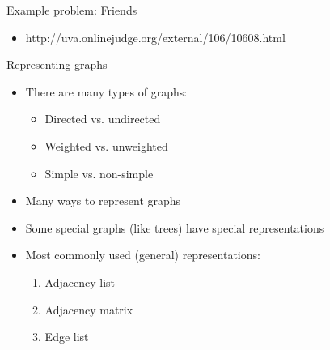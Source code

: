 \documentclass[12pt,t]{beamer}
\newcommand{\bi}{\begin{itemize}}
\newcommand{\ei}{\end{itemize}}
\begin{document}
\begin{frame}{Example problem: Friends}
    \bi
        \item http://uva.onlinejudge.org/external/106/10608.html
    \ei
\end{frame}


\begin{frame}{Representing graphs}
    \vspace{20pt}
    \bi
        \item There are many types of graphs:
            \bi
                \item Directed vs. undirected
                \item Weighted vs. unweighted
                \item Simple vs. non-simple
            \ei
        \item Many ways to represent graphs
        \item Some special graphs (like trees) have special representations
        \item Most commonly used (general) representations:
            \begin{enumerate}
                \item Adjacency list
                \item Adjacency matrix
                \item Edge list
            \end{enumerate}
    \ei
\end{frame}
\end{document}
